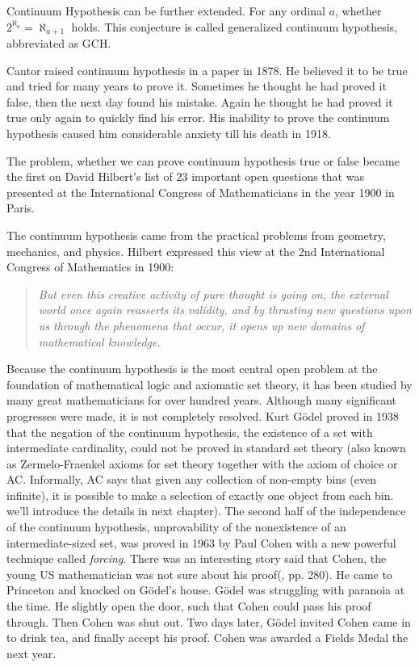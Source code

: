 \documentclass{article}
\begin{document}
Continuum Hypothesis can be further extended. For any ordinal $a$, whether $2^{\aleph_a} = \aleph_{a+1}$ holds. This conjecture is called generalized continuum hypothesis, abbreviated as GCH.

Cantor raised continuum hypothesis in a paper in 1878. He believed it to be true and tried for many years to prove it. Sometimes he thought he had proved it false, then the next day found his mistake. Again he thought he had proved it true only again to quickly find his error. His inability to prove the continuum hypothesis caused him considerable anxiety till his death in 1918.

The problem, whether we can prove continuum hypothesis true or false became the first on David Hilbert's list of 23 important open questions that was presented at the International Congress of Mathematicians in the year 1900 in Paris.

The continuum hypothesis came from the practical problems from geometry, mechanics, and physics. Hilbert expressed this view at the 2nd International Congress of Mathematics in 1900:

\begin{quotation}
\itshape
But even this creative activity of pure thought is going on, the external world once again reasserts its validity, and by thrusting new questions upon us through the phenomena that occur, it opens up new domains of mathematical knowledge.
\end{quotation}

Because the continuum hypothesis is the most central open problem at the foundation of mathematical logic and axiomatic set theory, it has been studied by many great mathematicians for over hundred years. Although many significant progresses were made, it is not completely resolved. Kurt Gödel proved in 1938 that the negation of the continuum hypothesis, the existence of a set with intermediate cardinality, could not be proved in standard set theory (also known as Zermelo-Fraenkel axioms for set theory together with the axiom of choice or AC. Informally, AC says that given any collection of non-empty bins (even infinite), it is possible to make a selection of exactly one object from each bin. we'll introduce the details in next chapter). The second half of the independence of the continuum hypothesis, unprovability of the nonexistence of an intermediate-sized set, was proved in 1963 by Paul Cohen with a new powerful technique called {\em forcing}. There was an interesting story said that Cohen, the young US mathematician was not sure about his proof(\cite{HanXueTao16}, pp. 280). He came to Princeton and knocked on Gödel's house. Gödel was struggling with paranoia at the time. He slightly open the door, such that Cohen could pass his proof through. Then Cohen was shut out. Two days later, Gödel invited Cohen came in to drink tea, and finally accept his proof. Cohen was awarded a Fields Medal the next year.
\end{document}

